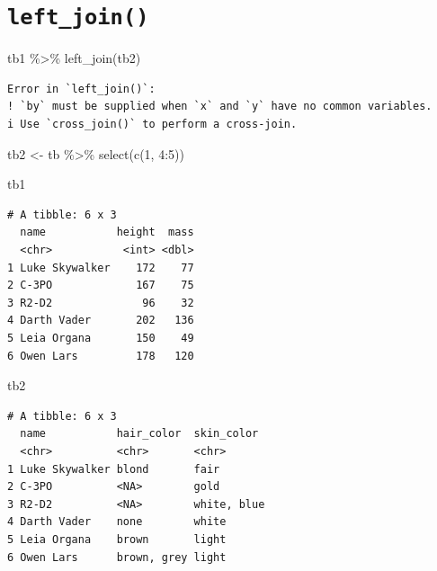 \documentclass[
  letterpaper,
]{ctexbook}
\newenvironment{Shaded}{\begin{snugshade}}{\end{snugshade}}
\newcommand{\DecValTok}[1]{\textcolor[rgb]{0.68,0.00,0.00}{#1}}
\newcommand{\FunctionTok}[1]{\textcolor[rgb]{0.28,0.35,0.67}{#1}}
\newcommand{\NormalTok}[1]{\textcolor[rgb]{0.00,0.23,0.31}{#1}}
\newcommand{\OtherTok}[1]{\textcolor[rgb]{0.00,0.23,0.31}{#1}}
\newcommand{\SpecialCharTok}[1]{\textcolor[rgb]{0.37,0.37,0.37}{#1}}
\begin{document}
\hypertarget{left_join}{%
\section{\texorpdfstring{\texttt{left\_join()}}{left\_join()}}\label{left_join}}

\begin{Shaded}
\begin{Highlighting}[]
\NormalTok{tb1 }\SpecialCharTok{\%\textgreater{}\%}
  \FunctionTok{left\_join}\NormalTok{(tb2)}
\end{Highlighting}
\end{Shaded}

\begin{verbatim}
Error in `left_join()`:
! `by` must be supplied when `x` and `y` have no common variables.
i Use `cross_join()` to perform a cross-join.
\end{verbatim}

\begin{Shaded}
\begin{Highlighting}[]
\NormalTok{tb2 }\OtherTok{\textless{}{-}}\NormalTok{ tb }\SpecialCharTok{\%\textgreater{}\%}
  \FunctionTok{select}\NormalTok{(}\FunctionTok{c}\NormalTok{(}\DecValTok{1}\NormalTok{, }\DecValTok{4}\SpecialCharTok{:}\DecValTok{5}\NormalTok{))}
\end{Highlighting}
\end{Shaded}

\begin{Shaded}
\begin{Highlighting}[]
\NormalTok{tb1}
\end{Highlighting}
\end{Shaded}

\begin{verbatim}
# A tibble: 6 x 3
  name           height  mass
  <chr>           <int> <dbl>
1 Luke Skywalker    172    77
2 C-3PO             167    75
3 R2-D2              96    32
4 Darth Vader       202   136
5 Leia Organa       150    49
6 Owen Lars         178   120
\end{verbatim}

\begin{Shaded}
\begin{Highlighting}[]
\NormalTok{tb2}
\end{Highlighting}
\end{Shaded}

\begin{verbatim}
# A tibble: 6 x 3
  name           hair_color  skin_color 
  <chr>          <chr>       <chr>      
1 Luke Skywalker blond       fair       
2 C-3PO          <NA>        gold       
3 R2-D2          <NA>        white, blue
4 Darth Vader    none        white      
5 Leia Organa    brown       light      
6 Owen Lars      brown, grey light      
\end{verbatim}
\end{document}
